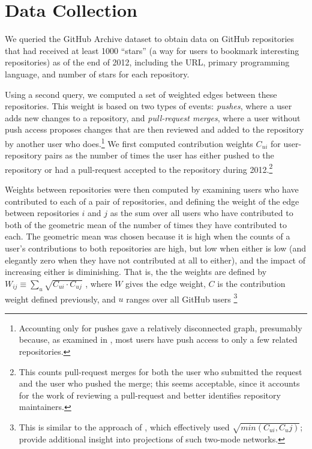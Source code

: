 \documentclass[11pt]{article}
\begin{document}
\section{Data Collection}
We queried the GitHub Archive dataset\cite{githubarchive} to obtain data on
GitHub repositories that had received at least 1000 ``stars'' (a way for users
to bookmark interesting repositories) as of the end of 2012, including the URL,
primary programming language, and number of stars for each repository.

Using a second query, we computed a set of weighted edges between these
repositories. This weight is based on two types of events: \emph{pushes}, where
a user adds new changes to a repository, and \emph{pull-request merges}, where a
user without push access proposes changes that are then reviewed and added to
the repository by another user who does.\footnote{Accounting only for pushes
gave a relatively disconnected graph, presumably because, as examined in
\cite{khadke}, most users have push access to only a few related repositories.}
We first computed contribution weights $C_{ui}$ for user-repository pairs as the
number of times the user has either pushed to the repository or had a
pull-request accepted to the repository during 2012.\footnote{This counts
pull-request merges for both the user who submitted the request and the user who
pushed the merge; this seems acceptable, since it accounts for the work of
reviewing a pull-request and better identifies repository maintainers.}

Weights between repositories were then computed by examining users who have
contributed to each of a pair of repositories, and defining the weight of the
edge between repositories $i$ and $j$ as the sum over all users who have
contributed to both of the geometric mean of the number of times they have
contributed to each. The geometric mean was chosen because it is high when the
counts of a user's contributions to both repositories are high, but low when
either is low (and elegantly zero when they have not contributed at all to
either), and the impact of increasing either is diminishing. That is, the the
weights are defined by $W_{ij} \equiv \sum_u \sqrt{C_{ui} \cdot C_{uj}}$ , where
$W$ gives the edge weight, $C$ is the contribution weight defined previously,
and $u$ ranges over all GitHub users \footnote{This is similar to the approach
of \cite{marrama}, which effectively used $\sqrt{min(C_{ui}, C_uj)}$;
\cite{opsahlproj,opsahl11} provide additional insight into projections of
such two-mode networks.}
\end{document}
